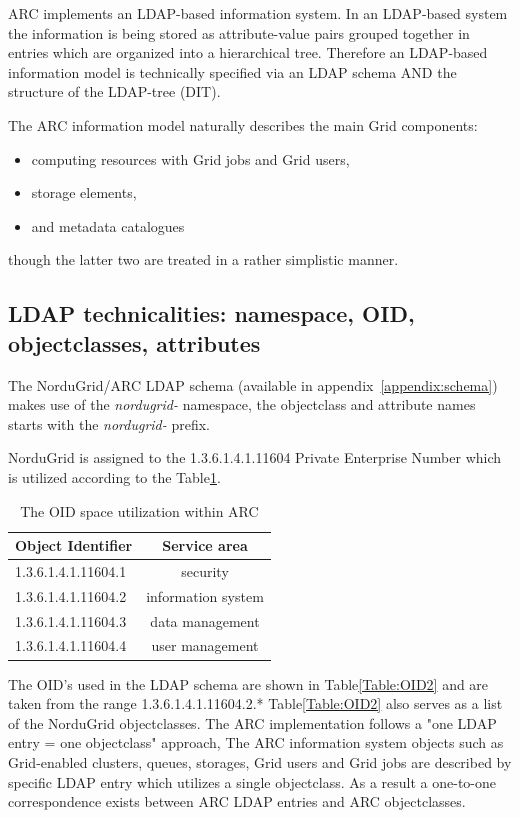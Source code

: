 \documentclass{article}
\begin{document}
ARC implements an LDAP-based information system. In an LDAP-based system the 
information is being stored as attribute-value pairs grouped 
together in entries which are organized into a hierarchical tree.
Therefore an LDAP-based information model is technically specified via 
an LDAP schema AND the structure of the LDAP-tree (DIT).


The ARC information model naturally describes the main Grid
components:
\begin{itemize} 
\item computing resources with Grid jobs and Grid users, 
\item storage elements,
\item and metadata catalogues
\end{itemize}
though the latter two are treated in a rather simplistic
manner.  

\subsection{LDAP technicalities: namespace, OID, objectclasses, attributes}

The NorduGrid/ARC LDAP schema (available in appendix~\ref{appendix:schema})
makes use of the {\it nordugrid-} namespace, the objectclass
and attribute names starts with the {\it nordugrid-} prefix.

NorduGrid is assigned to the {\mbox 1.3.6.1.4.1.11604} Private Enterprise Number 
which is utilized according to the Table\ref{Table:OID1}.


\providecommand{\tabularnewline}{\\}

\begin{table}
\centering
\begin{tabular}{|l|c|}
\hline
Object Identifier&
Service area\tabularnewline
\hline
\hline
1.3.6.1.4.1.11604.1&
security\tabularnewline
\hline
1.3.6.1.4.1.11604.2&
information system\tabularnewline
\hline
1.3.6.1.4.1.11604.3&
data management\tabularnewline
\hline
1.3.6.1.4.1.11604.4&
user management\tabularnewline
\hline
\end{tabular}
\caption{\label{Table:OID1} The OID space utilization within ARC}
\end{table}


The OID's used in the LDAP schema are shown in 
Table\ref{Table:OID2} and are taken from the range {\mbox 1.3.6.1.4.1.11604.2.*}
Table\ref{Table:OID2} also serves as a list of the NorduGrid objectclasses.
The ARC implementation follows a "one LDAP entry = one objectclass" approach,
The ARC information system objects such as Grid-enabled clusters, queues, storages, 
Grid users and Grid jobs are described by specific LDAP entry which utilizes
a single objectclass. As a result a one-to-one correspondence exists between
ARC LDAP entries and ARC objectclasses.
\end{document}
